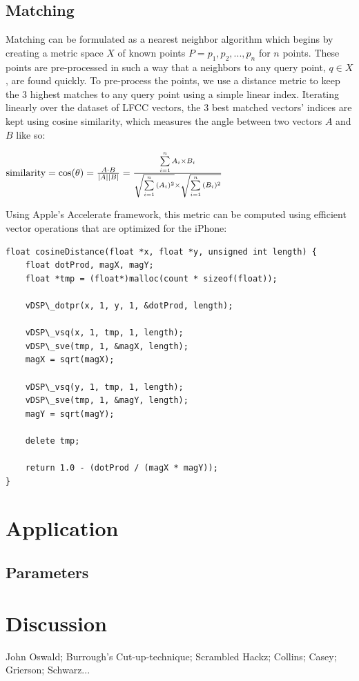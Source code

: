 
\subsection{Matching}

Matching can be formulated as a nearest neighbor algorithm which begins by creating a metric space $X$ of known points $P = p_1, p_2, ..., p_n$ for $n$ points.  These points are pre-processed in such a way that a neighbors to any query point, $q \in X$, are found quickly.  To pre-process the points, we use a distance metric to keep the 3 highest matches to any query point using a simple linear index.  Iterating linearly over the dataset of LFCC vectors, the 3 best matched vectors' indices are kept using cosine similarity, which measures the angle between two vectors $A$ and $B$ like so:

\begin{math}
\textnormal{similarity} = \cos(\theta) = {A \cdot B \over |A| |B|} = \frac{ \sum\limits_{i=1}^{n}{A_i \times B_i} }{ \\ \sqrt{\sum\limits_{i=1}^{n}{(A_i)^2}} \times \sqrt{\sum\limits_{i=1}^{n}{(B_i)^2}}} 
\end{math}

Using Apple's Accelerate framework, this metric can be computed using efficient vector operations that are optimized for the iPhone:
\clearpage
\begin{lstlisting}
float cosineDistance(float *x, float *y, unsigned int length) {
	float dotProd, magX, magY;
	float *tmp = (float*)malloc(count * sizeof(float));
	
	vDSP\_dotpr(x, 1, y, 1, &dotProd, length);
	
	vDSP\_vsq(x, 1, tmp, 1, length);
	vDSP\_sve(tmp, 1, &magX, length);
	magX = sqrt(magX);
	
	vDSP\_vsq(y, 1, tmp, 1, length);
	vDSP\_sve(tmp, 1, &magY, length);
	magY = sqrt(magY);
	
	delete tmp;
	
	return 1.0 - (dotProd / (magX * magY));
}
\end{lstlisting}

\section{Application}

\subsection{Parameters}
\label{subsec:parameters}

\section{Discussion}

John Oswald; Burrough's Cut-up-technique; Scrambled Hackz; Collins; Casey; Grierson; Schwarz...